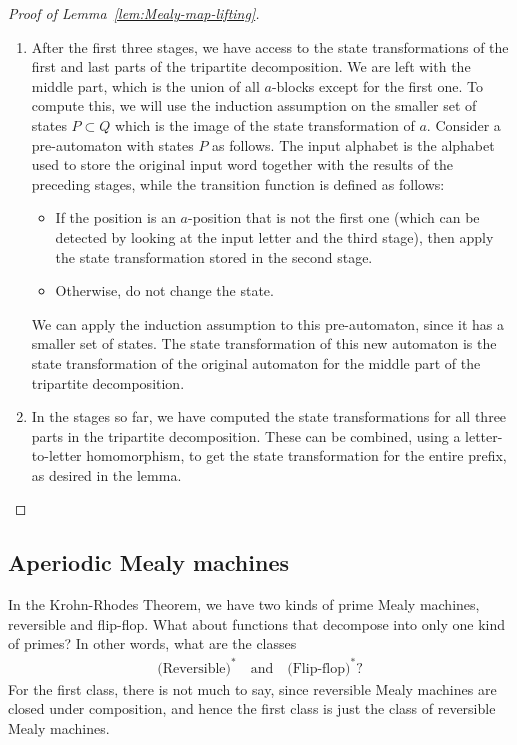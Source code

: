 \begin{proof}[Proof of Lemma~\ref{lem:Mealy-map-lifting}]
\begin{enumerate}
    \item After the first three stages, we have access to the state transformations of the  first and last parts of the tripartite decomposition. We are left with the middle part, which is the union of all $a$-blocks except for the first one. To compute this, we will use the induction assumption on the smaller set of states $P \subset Q$ which is the image of the state transformation of $a$. Consider a pre-automaton with  states $P$ as follows. The  input alphabet is the alphabet used to store the original input word together with the results of the preceding stages, while the  transition function  is defined as follows:
     \begin{itemize}
        \item If the position is  an $a$-position that is not the first one (which can be detected by looking at the input letter and the third stage), then apply the state transformation stored in the second stage. 
        \item Otherwise,  do not change the state.
     \end{itemize} 
     We can apply the induction assumption to this pre-automaton, since it has a smaller set of states. The  state transformation of this new automaton is the state transformation of the original automaton for the middle part of the tripartite decomposition. 
     \item In the stages so far, we have computed the state transformations for all three parts in the tripartite decomposition. These can be combined, using a letter-to-letter homomorphism, to get the state transformation for the entire prefix, as desired in the lemma.
\end{enumerate}
    \end{proof}


\subsection{Aperiodic Mealy machines}
\label{sec:one-kind-primes}
In the Krohn-Rhodes Theorem, we have two kinds of prime Mealy machines, reversible and flip-flop. What about functions that decompose into only one kind of primes? In other words, what are the classes
\begin{align*}
\text{(Reversible)}^* 
\quad \text{and} \quad 
\text{(Flip-flop)}^*?
\end{align*}
For the first class, there is not much to say, since reversible Mealy machines are closed under composition, and hence the first class is just the class of reversible Mealy machines.

